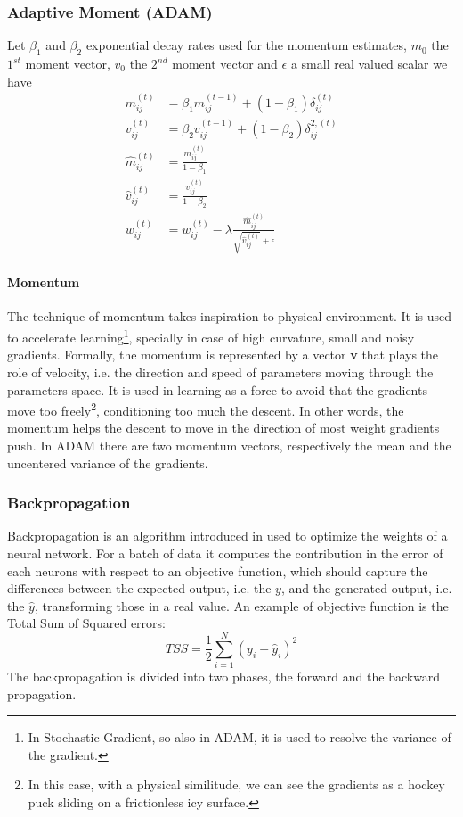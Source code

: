 \subsubsection*{Adaptive Moment (ADAM)}
Let $\beta_1$ and $\beta_2$ exponential decay rates used for the momentum estimates, $m_0$ the $1^{st}$ moment vector, $v_0$ the $2^{nd}$ moment vector and $\epsilon$ a small real valued scalar we have 
\begin{align}
	m_{ij}^{(t)} &= \beta_1m_{ij}^{(t-1)} + (1 - \beta_1)\delta_{ij}^{(t)} \\
	v_{ij}^{(t)} &= \beta_2v_{ij}^{(t-1)} + (1 - \beta_2)\delta_{ij}^{2,  (t)} \\
	\hat{m}_{ij}^{(t)} &= \frac{m_{ij}^{(t)}}{1 - \beta_{1}} \\
	\hat{v}_{ij}^{(t)} &= \frac{v_{ij}^{(t)}}{1 - \beta_{2}} \\
	w_{ij}^{(t)} &= w_{ij}^{(t)} - \lambda\frac{\hat{m}_{ij}^{(t)}}{\sqrt{\hat{v}_{ij}^{(t)}} + \epsilon}
\end{align}
\paragraph{Momentum}
The technique of momentum \cite{POLYAK19641} takes inspiration to physical environment. It is used  to accelerate learning\footnote{In Stochastic Gradient, so also in ADAM, it is used to resolve the variance of the gradient.}, specially in case of high curvature, small and noisy gradients. Formally, the momentum is represented by a vector \textbf{v} that plays the role of velocity, i.e. the direction and speed of parameters moving through the parameters space. It is used in learning as a force to avoid that the gradients move too freely\footnote{In this case, with a physical similitude, we can see the gradients as a hockey puck sliding on a frictionless icy surface.}, conditioning too much the descent. In other words, the momentum helps the descent to move in the direction of most weight gradients push. In ADAM there are two momentum vectors, respectively the mean and the uncentered variance of the gradients. 

\subsubsection{Backpropagation}\label{subsubsec:backpropagation}
Backpropagation is an algorithm introduced in \cite{RUM:1986} used to optimize the weights of a neural network. For a batch of data it computes the contribution in the error of each neurons with respect to an objective function, which should capture the differences between the expected output, i.e. the $y$, and the generated output, i.e. the $\hat{y}$, transforming those in a real value. An example of objective function is the Total Sum of Squared errors:
\begin{equation}
	TSS = \frac{1}{2}\sum\limits_{i=1}^{N}(y_i - \hat{y}_{i})^{2}
\end{equation}\label{eq:tss}
The backpropagation is divided into two phases, the forward and the backward propagation.

